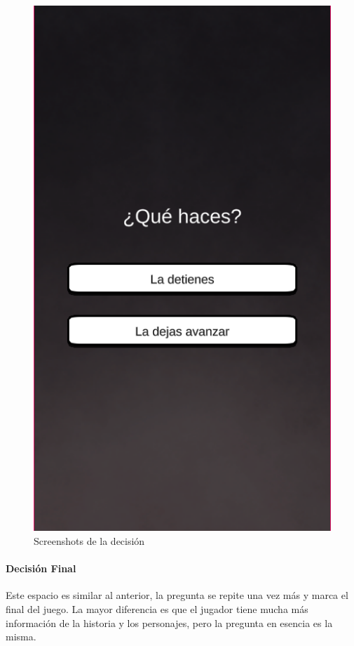 \begin{figure}[ht]
\begin{minipage}{0.45\textwidth}
\begin{flushright}
	   		\includegraphics[scale=.5]{imgs/screenshot02.png}
		\end{flushright}
	\end{minipage}
	\caption{Screenshots de la decisión}
	\label{multifig:decision}
\end{figure}

\paragraph{Decisión Final}
Este espacio es similar al anterior, la pregunta se repite una vez más y marca el final del juego. La mayor diferencia es que el jugador tiene mucha más información de la historia y los personajes, pero la pregunta en esencia es la misma.

